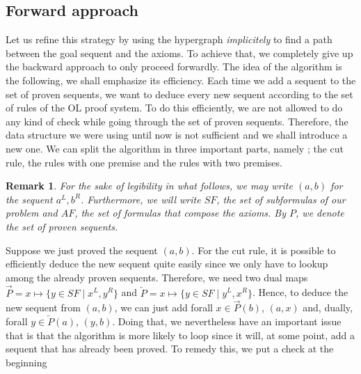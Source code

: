 \documentclass[a4paper, 11pt]{article}
\newtheorem*{remark}{Remark}
\begin{document}
    \subsection{Forward approach}
    Let us refine this strategy by using the
    hypergraph \textit{implicitely} to find a path between the goal sequent and the axioms. To achieve
    that, we completely give up the backward approach to only proceed forwardly. 
    The idea of the algorithm is the following, we shall emphasize its efficiency.
    Each time we add a sequent to the set of proven sequents, we want to deduce every new sequent
    according to the set of rules of the OL proof system.
    To do this efficiently, we are not allowed to do any kind of check while going through the set of
    proven sequents. Therefore, the data structure we were using until now is not sufficient
    and we shall introduce a new one. We can split the algorithm in three important parts, namely ;
    the cut rule, the rules with one premise and the rules with two premises. 
    \begin{remark}
	For the sake of legibility in what follows, we may write $(a,b)$ for the sequent $a^L,b^R$. 
	    Furthermore,
	    we will write $SF$, the set of subformulas of our problem and $AF$, the set of formulas
	    that compose the axioms. By $P$, we denote the set of proven sequents.
    \end{remark} 
    Suppose we just proved the sequent $(a,b)$. For the cut rule,
    it is possible to efficiently deduce the new sequent quite easily since we only have to
    lookup among the already proven sequents. Therefore, we need two dual maps 
    $\overrightarrow{P}=x\mapsto\{y\in SF\mid x^L,y^R\}$ and
    $\overleftarrow{P}=x\mapsto\{y\in SF\mid y^L,x^R\}$. Hence, to deduce
    the new sequent from $(a,b)$, we can just add forall $x\in\overrightarrow{P}(b)$, $(a,x)$ and,
    dually, forall $y\in\overleftarrow{P}(a)$, $(y,b)$. Doing that, we nevertheless have an important
    issue that is that the algorithm is more likely to loop since it will, at some point, add a sequent
    that has already been proved. To remedy this, we put a check at the beginning
\end{document}
